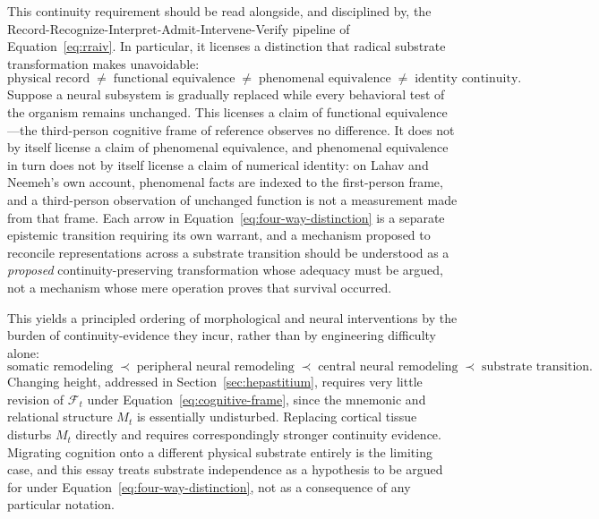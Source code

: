 \documentclass[12pt]{article}
\begin{document}
This continuity requirement should be read alongside, and disciplined by, the Record-Recognize-Interpret-Admit-Intervene-Verify pipeline of Equation~\eqref{eq:rraiv}. In particular, it licenses a distinction that radical substrate transformation makes unavoidable:
\begin{equation}
\text{physical record} \;\ne\; \text{functional equivalence} \;\ne\; \text{phenomenal equivalence} \;\ne\; \text{identity continuity}.
\label{eq:four-way-distinction}
\end{equation}
Suppose a neural subsystem is gradually replaced while every behavioral test of the organism remains unchanged. This licenses a claim of functional equivalence---the third-person cognitive frame of reference observes no difference. It does not by itself license a claim of phenomenal equivalence, and phenomenal equivalence in turn does not by itself license a claim of numerical identity: on Lahav and Neemeh's own account, phenomenal facts are indexed to the first-person frame, and a third-person observation of unchanged function is not a measurement made from that frame. Each arrow in Equation~\eqref{eq:four-way-distinction} is a separate epistemic transition requiring its own warrant, and a mechanism proposed to reconcile representations across a substrate transition should be understood as a \emph{proposed} continuity-preserving transformation whose adequacy must be argued, not a mechanism whose mere operation proves that survival occurred.

This yields a principled ordering of morphological and neural interventions by the burden of continuity-evidence they incur, rather than by engineering difficulty alone:
\begin{equation}
\text{somatic remodeling} \;\prec\; \text{peripheral neural remodeling} \;\prec\; \text{central neural remodeling} \;\prec\; \text{substrate transition}.
\label{eq:continuity-burden}
\end{equation}
Changing height, addressed in Section~\ref{sec:hepastitium}, requires very little revision of $\mathcal{F}_t$ under Equation~\eqref{eq:cognitive-frame}, since the mnemonic and relational structure $M_t$ is essentially undisturbed. Replacing cortical tissue disturbs $M_t$ directly and requires correspondingly stronger continuity evidence. Migrating cognition onto a different physical substrate entirely is the limiting case, and this essay treats substrate independence as a hypothesis to be argued for under Equation~\eqref{eq:four-way-distinction}, not as a consequence of any particular notation.
\end{document}
